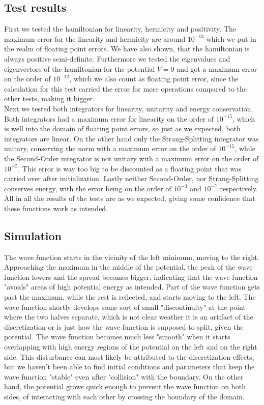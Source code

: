 \documentclass[11pt, letterpaper, onecolumn]{article}
\begin{document}
\subsection{Test results}
First we tested the hamiltonian for linearity, hermicity and positivity. The maximum error for the linearity and hermicity are around $10^{-13}$ which we put in the realm of floating point errors. We have also shown, that the hamiltonian is always positive semi-definite. Furthermore we tested the eigenvalues and eigenvectors of the hamiltonian for the potential $V=0$ and got a maximum error on the order of $10^{-12}$, which we also count as floating point error, since the calculation for this test carried the error for more operations compared to the other tests, making it bigger.\\
Next we tested both integrators for linearity, unitarity and energy conservation. Both integrators had a maximum error for linearity on the order of $10^{-15}$, which is well into the domain of floating point errors, so just as we expected, both integrators are linear. On the other hand only the Strang-Splitting integrator was unitary, conserving the norm with a maximum error on the order of $10^{-15}$, while the Second-Order integrator is not unitary with a maximum error on the order of $10^{-5}$. This error is way too big to be discounted as a floating point that was carried over after initialization. Lastly neither Second-Order, nor Strang-Splitting conserves energy, with the error being on the order of $10^{-4}$ and $10^{-7}$ respectively.\\
All in all the results of the tests are as we expected, giving some confidence that these functions work as intended.
\subsection{Simulation}
The wave function starts in the vicinity of the left minimum, moving to the right. Approaching the maximum in the middle of the potential, the peak of the wave function lowers and the spread becomes bigger, indicating that the wave function "avoids" areas of high potential energy as intended. Part of the wave function gets past the maximum, while the rest is reflected, and starts moving to the left. The wave function shortly develops some sort of small "discontinuity" at the point where the two halves separate, which is not clear weather it is an artifact of the discretization or is just how the wave function is supposed to split, given the potential. The wave function becomes much less "smooth" when it starts overlapping with high energy regions of the potential on the left and on the right side. This disturbance can most likely be attributed to the discretization effects, but we haven't been able to find initial conditions and parameters that keep the wave function "stable" even after "collision" with the boundary. On the other hand, the potential grows quick enough to prevent the wave function on both sides, of interacting with each other by crossing the boundary of the domain.
\end{document}
